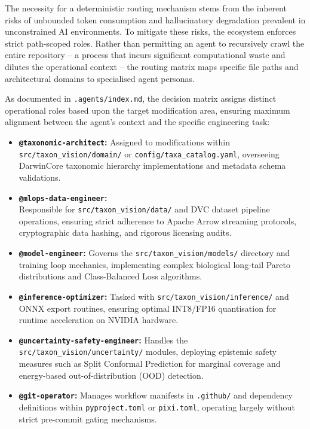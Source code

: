 The necessity for a deterministic routing mechanism stems from the inherent risks of unbounded token consumption and hallucinatory degradation prevalent in unconstrained AI environments. To mitigate these risks, the ecosystem enforces strict path-scoped roles. Rather than permitting an agent to recursively crawl the entire repository -- a process that incurs significant computational waste and dilutes the operational context -- the routing matrix maps specific file paths and architectural domains to specialised agent personas.

As documented in \texttt{.agents/index.md}, the decision matrix assigns distinct operational roles based upon the target modification area, ensuring maximum alignment between the agent's context and the specific engineering task:
\begin{itemize}
    \item \textbf{\texttt{@taxonomic-architect}:} Assigned to modifications within \texttt{src/taxon\_vision/domain/} or \texttt{config/taxa\_catalog.yaml}, overseeing DarwinCore taxonomic hierarchy implementations and metadata schema validations.
    \item \textbf{\texttt{@mlops-data-engineer}:}\\Responsible for \texttt{src/taxon\_vision/data/} and DVC dataset pipeline operations, ensuring strict adherence to Apache Arrow streaming protocols, cryptographic data hashing, and rigorous licensing audits.
    \item \textbf{\texttt{@model-engineer}:} Governs the \texttt{src/taxon\_vision/models/} directory and training loop mechanics, implementing complex biological long-tail Pareto distributions and Class-Balanced Loss algorithms.
    \item \textbf{\texttt{@inference-optimizer}:} Tasked with \texttt{src/taxon\_vision/inference/} and ONNX export routines, ensuring optimal INT8/FP16 quantisation for runtime acceleration on NVIDIA hardware.
    \item \textbf{\texttt{@uncertainty-safety-engineer}:} Handles the \texttt{src/taxon\_vision/uncertainty/} modules, deploying epistemic safety measures such as Split Conformal Prediction for marginal coverage and energy-based out-of-distribution (OOD) detection.
    \item \textbf{\texttt{@git-operator}:} Manages workflow manifests in \texttt{.github/} and dependency definitions within \texttt{pyproject.toml} or \texttt{pixi.toml}, operating largely without strict pre-commit gating mechanisms.
\end{itemize}

